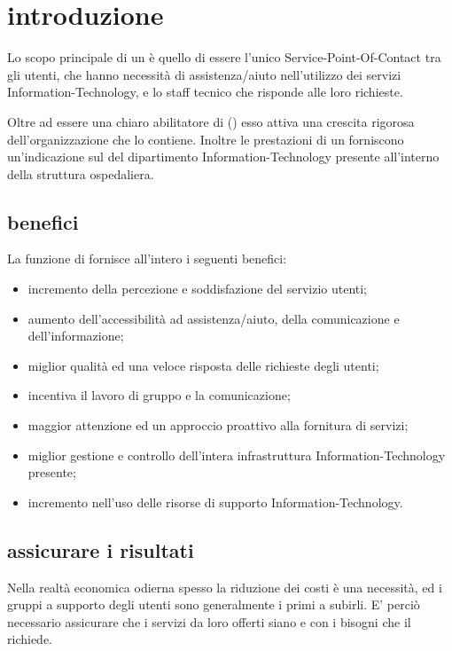%
%
\section[Introduzione]{introduzione}
\label{sd-scope}
Lo scopo principale di un  è quello di essere l'unico \ac{Service-Point-Of-Contact} tra gli utenti, che hanno necessità di assistenza/aiuto nell'utilizzo dei servizi \acs{Information-Technology}, e lo staff tecnico che risponde alle loro richieste.

Oltre ad essere una chiaro abilitatore di  () esso attiva una crescita rigorosa dell'organizzazione che lo contiene. Inoltre le prestazioni di un  forniscono un'indicazione sul  del dipartimento \acs{Information-Technology} presente all'interno della struttura ospedaliera.

\subsection[Benefici]{benefici}
\label{sd-benefits}
La funzione di  fornisce all'intero \entity{} i seguenti benefici:

\begin{itemize}
\item{incremento della percezione e soddisfazione del servizio utenti;}
\item{aumento dell'accessibilità ad assistenza/aiuto, della comunicazione e dell'informazione;}
\item{miglior qualità ed una veloce risposta delle richieste degli utenti;}
\item{incentiva il lavoro di gruppo e la comunicazione;}
\item{maggior attenzione ed un approccio proattivo alla fornitura di servizi;}
\item{miglior gestione e controllo dell'intera infrastruttura \acs{Information-Technology} presente;}
\item{incremento nell'uso delle risorse di supporto \acs{Information-Technology}.}
\end{itemize}

\subsection[Assicurare i risultati]{assicurare i risultati}
\label{sd-ensuring-results}
Nella realtà economica odierna spesso la riduzione dei costi è una necessità, ed i gruppi a supporto degli utenti sono generalmente i primi a subirli. E' perciò necessario assicurare che i servizi da loro offerti siano  e  con i bisogni che il  richiede.

